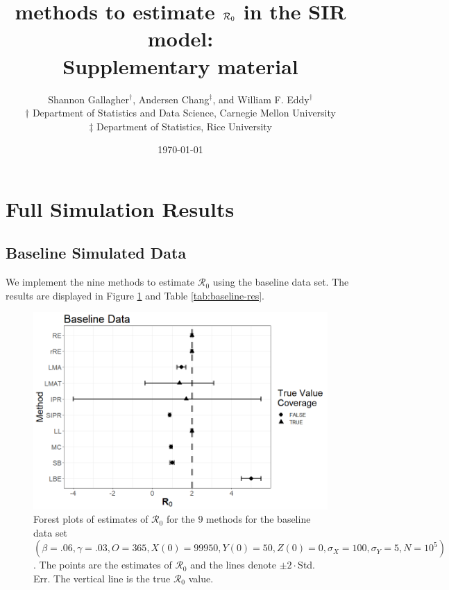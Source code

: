 \documentclass[12pt]{article}
\title{\Wxxsir methods to estimate $\rr$ in the SIR model: \\ Supplementary material}
\author{ Shannon Gallagher$^{\dag}$, Andersen Chang$^{\ddag}$, and William F. Eddy$^{\dag}$ \\$\dag$ Department of Statistics and Data Science, Carnegie Mellon University\\ $\ddag$ Department of Statistics, Rice University}
\date{\today}
\newcommand{\xxsir}{\ensuremath{9} } %
\newcommand{\wxxsir}{nine } %
\newcommand{\rr}{\ensuremath{\mathcal{R}_0}}
\begin{document}
\maketitle

\section{Full Simulation Results}

\subsection{Baseline Simulated Data}\label{sec:res-base}
We implement the \wxxsir methods to estimate $\rr$ using the baseline data set.  The results are displayed in Figure \ref{fig:baseline-res} and Table \ref{tab:baseline-res}.
\begin{figure}[H]
  \centering
  \includegraphics[scale=0.5]{images/BaseBase.tiff}
  \caption{Forest plots of estimates of $\rr$ for the \xxsir methods for the baseline data set $(\beta=.06, \gamma=.03, O=365, X(0)=99950, Y(0)=50, Z(0)=0, \sigma_X=100, \sigma_Y=5, N=10^5)$.  The points are the estimates of $\rr$ and the lines denote $\pm 2\cdot $Std. Err.  The vertical line is the true $\rr$ value.}\label{fig:baseline-res}
  \end{figure}
\end{document}
